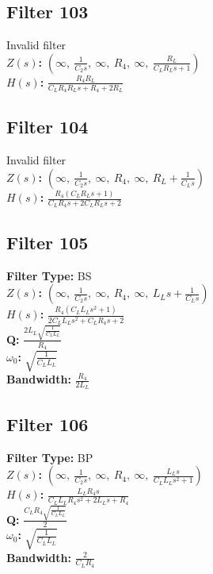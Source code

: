 \documentclass{article}
\begin{document}
\subsection*{Filter 103}
Invalid filter \\ 
\textbf{$Z(s)$:} $\left( \infty, \  \frac{1}{C_{2} s}, \  \infty, \  R_{4}, \  \infty, \  \frac{R_{L}}{C_{L} R_{L} s + 1}\right)$ \\ 
\textbf{$H(s)$:} $\frac{R_{4} R_{L}}{C_{L} R_{4} R_{L} s + R_{4} + 2 R_{L}}$ \\ 
\subsection*{Filter 104}
Invalid filter \\ 
\textbf{$Z(s)$:} $\left( \infty, \  \frac{1}{C_{2} s}, \  \infty, \  R_{4}, \  \infty, \  R_{L} + \frac{1}{C_{L} s}\right)$ \\ 
\textbf{$H(s)$:} $\frac{R_{4} \left(C_{L} R_{L} s + 1\right)}{C_{L} R_{4} s + 2 C_{L} R_{L} s + 2}$ \\ 
\subsection*{Filter 105}
\textbf{Filter Type:} BS \\ 
\textbf{$Z(s)$:} $\left( \infty, \  \frac{1}{C_{2} s}, \  \infty, \  R_{4}, \  \infty, \  L_{L} s + \frac{1}{C_{L} s}\right)$ \\ 
\textbf{$H(s)$:} $\frac{R_{4} \left(C_{L} L_{L} s^{2} + 1\right)}{2 C_{L} L_{L} s^{2} + C_{L} R_{4} s + 2}$ \\ 
\textbf{Q:} $\frac{2 L_{L} \sqrt{\frac{1}{C_{L} L_{L}}}}{R_{4}}$ \\ 
\textbf{$\omega_0$:} $\sqrt{\frac{1}{C_{L} L_{L}}}$ \\ 
\textbf{Bandwidth:} $\frac{R_{4}}{2 L_{L}}$ \\ 
\subsection*{Filter 106}
\textbf{Filter Type:} BP \\ 
\textbf{$Z(s)$:} $\left( \infty, \  \frac{1}{C_{2} s}, \  \infty, \  R_{4}, \  \infty, \  \frac{L_{L} s}{C_{L} L_{L} s^{2} + 1}\right)$ \\ 
\textbf{$H(s)$:} $\frac{L_{L} R_{4} s}{C_{L} L_{L} R_{4} s^{2} + 2 L_{L} s + R_{4}}$ \\ 
\textbf{Q:} $\frac{C_{L} R_{4} \sqrt{\frac{1}{C_{L} L_{L}}}}{2}$ \\ 
\textbf{$\omega_0$:} $\sqrt{\frac{1}{C_{L} L_{L}}}$ \\ 
\textbf{Bandwidth:} $\frac{2}{C_{L} R_{4}}$ \\ 
\end{document}
